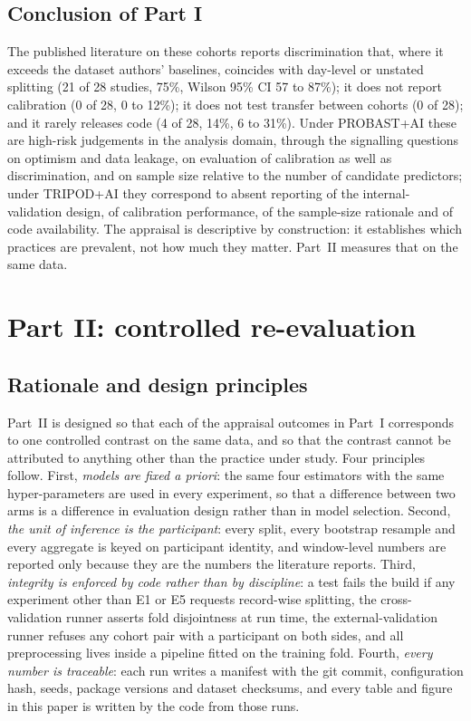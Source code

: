 \documentclass[11pt,a4paper]{article}
\begin{document}
\subsection{Conclusion of Part I}
The published literature on these cohorts reports discrimination that, where it exceeds the
dataset authors' baselines, coincides with day-level or unstated splitting (21 of 28 studies,
75\%, Wilson 95\% CI 57 to 87\%); it does not report calibration (0 of 28, 0 to 12\%); it does
not test transfer between cohorts (0 of 28); and it rarely releases code (4 of 28, 14\%, 6 to
31\%). Under PROBAST+AI these are high-risk judgements in the analysis domain, through the
signalling questions on optimism and data leakage, on evaluation of calibration as well as
discrimination, and on sample size relative to the number of candidate predictors; under
TRIPOD+AI they correspond to absent reporting of the internal-validation design, of calibration
performance, of the sample-size rationale and of code availability. The appraisal is descriptive
by construction: it establishes which practices are prevalent, not how much they matter. Part~II
measures that on the same data.

\section{Part II: controlled re-evaluation}
\subsection{Rationale and design principles}
Part~II is designed so that each of the appraisal outcomes in Part~I corresponds to one
controlled contrast on the same data, and so that the contrast cannot be attributed to anything
other than the practice under study. Four principles follow. First, \emph{models are fixed a
priori}: the same four estimators with the same hyper-parameters are used in every experiment,
so that a difference between two arms is a difference in evaluation design rather than in
model selection. Second, \emph{the unit of inference is the participant}: every split, every
bootstrap resample and every aggregate is keyed on participant identity, and window-level
numbers are reported only because they are the numbers the literature reports. Third,
\emph{integrity is enforced by code rather than by discipline}: a test fails the build if any
experiment other than E1 or E5 requests record-wise splitting, the cross-validation runner
asserts fold disjointness at run time, the external-validation runner refuses any cohort pair
with a participant on both sides, and all preprocessing lives inside a pipeline fitted on the
training fold. Fourth, \emph{every number is traceable}: each run writes a manifest with the
git commit, configuration hash, seeds, package versions and dataset checksums, and every table
and figure in this paper is written by the code from those runs.
\end{document}
